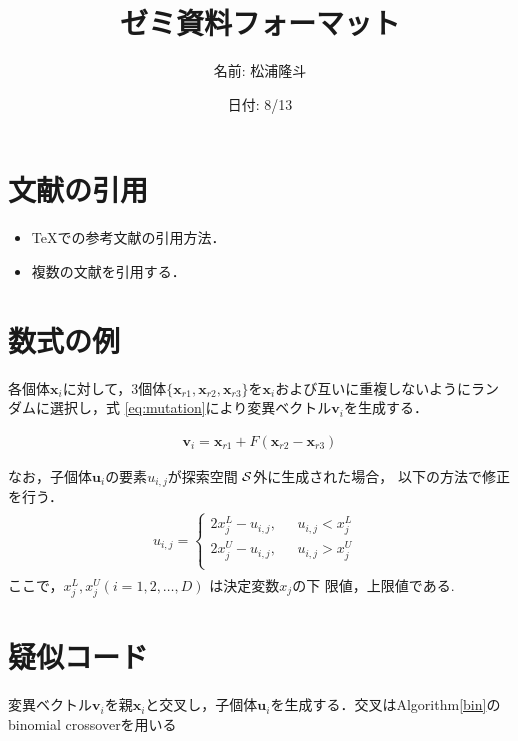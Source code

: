 \documentclass[onecolumn,10pt]{jarticle}
\title{ゼミ資料フォーマット }
\author{名前: 松浦隆斗}
\date{日付: 8/13}
\begin{document}
\maketitle


\section{文献の引用}

\begin{itemize}
      \item TeXでの参考文献の引用方法\cite{DE}．
      \item 複数の文献を引用する\cite{EA1,EA2}．
\end{itemize}


\section{数式の例}
各個体$\bm{x}_i$に対して，3個体$ \{  \bm{x}_{r1},\bm{x}_{r2},\bm{x}_{r3}  \} $を$\bm{x}_i$および互いに重複しないようにランダムに選択し，式
\eqref{eq:mutation}により変異ベクトル$\bm{v}_i$を生成する．

 \begin{eqnarray}
 \bm{v}_i= \bm{x}_{r1}+ F (\bm{x}_{r2}-\bm{x}_{r3})
\label{eq:mutation}
\end{eqnarray}

なお，子個体$\bm{u}_i$の要素$u_{i,j}$が探索空間 $\cal{S}$外に生成された場合，
以下の方法で修正を行う．
 \begin{eqnarray}
\begin{split}
u_{i,j} =
\left\{
\begin{array}{ll}
 2x^{L}_j-u_{i,j},  & \mbox{ $u_{i,j} <x^{L}_j $   } \\
  2x^{U}_j-u_{i,j},		   & \mbox{ $u_{i,j} >x^{U}_j $ } \\
\end{array}
\right.
\end{split}
\end{eqnarray}
ここで，$x^{L}_j, x^{U}_j (i = 1, 2, \dots ,D)$ は決定変数$x_j$の下
限値，上限値である.





\section{疑似コード}
変異ベクトル$\bm{v}_i$を親$\bm{x}_i$と交叉し，子個体$\bm{u}_{i}$を生成する．交叉はAlgorithm\ref{bin}のbinomial crossoverを用いる
\end{document}
